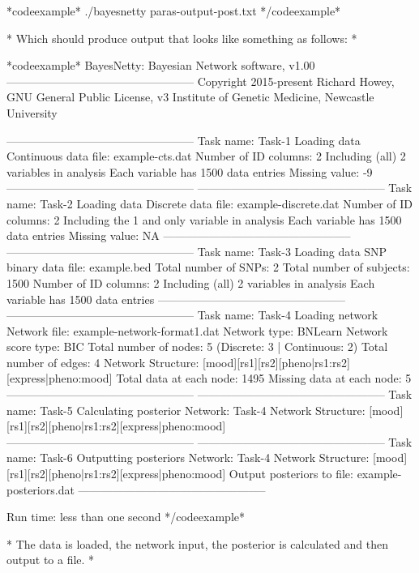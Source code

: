*codeexample* ./bayesnetty paras-output-post.txt */codeexample*

* Which should produce output that looks like something as follows: *

*codeexample* BayesNetty: Bayesian Network software, v1.00 -------------------------------------------------- Copyright 2015-present Richard Howey, GNU General Public License, v3 Institute of Genetic Medicine, Newcastle University

-------------------------------------------------- Task name: Task-1 Loading data Continuous data file: example-cts.dat Number of ID columns: 2 Including (all) 2 variables in analysis Each variable has 1500 data entries Missing value: -9 -------------------------------------------------- -------------------------------------------------- Task name: Task-2 Loading data Discrete data file: example-discrete.dat Number of ID columns: 2 Including the 1 and only variable in analysis Each variable has 1500 data entries Missing value: NA -------------------------------------------------- -------------------------------------------------- Task name: Task-3 Loading data SNP binary data file: example.bed Total number of SNPs: 2 Total number of subjects: 1500 Number of ID columns: 2 Including (all) 2 variables in analysis Each variable has 1500 data entries -------------------------------------------------- -------------------------------------------------- Task name: Task-4 Loading network Network file: example-network-format1.dat Network type: BNLearn Network score type: BIC Total number of nodes: 5 (Discrete: 3 | Continuous: 2) Total number of edges: 4 Network Structure: [mood][rs1][rs2][pheno|rs1:rs2][express|pheno:mood] Total data at each node: 1495 Missing data at each node: 5 -------------------------------------------------- -------------------------------------------------- Task name: Task-5 Calculating posterior Network: Task-4 Network Structure: [mood][rs1][rs2][pheno|rs1:rs2][express|pheno:mood] -------------------------------------------------- -------------------------------------------------- Task name: Task-6 Outputting posteriors Network: Task-4 Network Structure: [mood][rs1][rs2][pheno|rs1:rs2][express|pheno:mood] Output posteriors to file: example-posteriors.dat --------------------------------------------------

Run time: less than one second */codeexample*

* The data is loaded, the network input, the posterior is calculated and then output to a file. *




